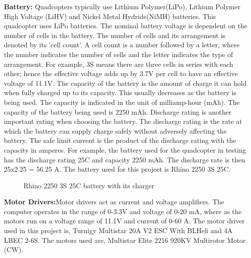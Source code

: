 \documentclass[letterpaper%
, twoside%
, 12pt%
,memoire%
, english%
,creativecommons,hyperref%
]{thETS}
\theoremstyle{newThmStyle}
\begin{document}
\textbf{Battery:} Quadcopters typically use Lithium Polymer(LiPo), Lithium Polymer High Voltage (LiHV) and Nickel Metal Hydride(NiMH) batteries. This quadcopter uses LiPo batteries. The nominal battery voltage is dependent on the number of cells in the battery. The number of cells and its arrangement is denoted by its 'cell count'. A cell count is a number followed by a letter, where the number indicates the number of cells and the letter indicates the type of arrangement. For example, 3S means there are three cells in series with each other; hence the effective voltage adds up by 3.7V per cell to have an effective voltage of 11.1V. The capacity of the battery is the amount of charge it can hold when fully charged up to its capacity. This usually decreases as the battery is being used. The capacity is indicated in the unit of milliamp-hour (mAh). The capacity of the battery being used is 2250 mAh. Discharge rating is another important rating when choosing the battery. The discharge rating is the rate at which the battery can supply charge safely without adversely affecting the battery. The safe limit current is the product of the discharge rating with the capacity in amperes. For example, the battery used for the quadcopter in testing has the discharge rating 25C and capacity 2250 mAh. The discharge rate is then 25x2.25 = 56.25 A. The battery used for this project is Rhino 2250 3S 25C. 

\begin{figure}[H]
	\centering
	\parbox{0.75\textwidth}{\caption{{Rhino 2250 3S 25C battery with its charger \label{Fig:battery}}}}
\end{figure}
\textbf{Motor Drivers:}Motor drivers act as current and voltage amplifiers. The computer operates in the range of 0-3.3V and voltage of 0-20 mA, where as the motors run on a voltage range of 11.1V and current of 0-60 A. The motor driver used in this project is, Turnigy Multistar 20A V2 ESC With BLHeli and 4A LBEC 2-6S. The motors used are, Multistar Elite 2216 920KV Multirotor Motor (CW).

\FloatBarrier
\end{document}
